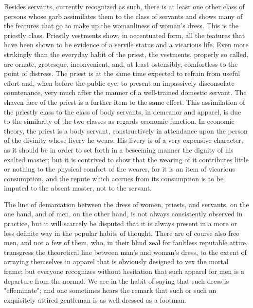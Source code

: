 \documentclass[12pt]{report}
\begin{document}
Besides servants, currently recognized as such, there is at least one
other class of persons whose garb assimilates them to the class
of servants and shows many of the features that go to make up the
womanliness of woman's dress. This is the priestly class. Priestly
vestments show, in accentuated form, all the features that have been
shown to be evidence of a servile status and a vicarious life. Even
more strikingly than the everyday habit of the priest, the vestments,
properly so called, are ornate, grotesque, inconvenient, and, at least
ostensibly, comfortless to the point of distress. The priest is at the
same time expected to refrain from useful effort and, when before the
public eye, to present an impassively disconsolate countenance, very
much after the manner of a well-trained domestic servant. The
shaven face of the priest is a further item to the same effect. This
assimilation of the priestly class to the class of body servants, in
demeanor and apparel, is due to the similarity of the two classes as
regards economic function. In economic theory, the priest is a body
servant, constructively in attendance upon the person of the divinity
whose livery he wears. His livery is of a very expensive character, as
it should be in order to set forth in a beseeming manner the dignity of
his exalted master; but it is contrived to show that the wearing of it
contributes little or nothing to the physical comfort of the wearer,
for it is an item of vicarious consumption, and the repute which accrues
from its consumption is to be imputed to the absent master, not to the
servant.

The line of demarcation between the dress of women, priests, and
servants, on the one hand, and of men, on the other hand, is not always
consistently observed in practice, but it will scarcely be disputed
that it is always present in a more or less definite way in the popular
habits of thought. There are of course also free men, and not a few
of them, who, in their blind zeal for faultless reputable attire,
transgress the theoretical line between man's and woman's dress, to the
extent of arraying themselves in apparel that is obviously designed to
vex the mortal frame; but everyone recognizes without hesitation that
such apparel for men is a departure from the normal. We are in the habit
of saying that such dress is "effeminate"; and one sometimes hears the
remark that such or such an exquisitely attired gentleman is as well
dressed as a footman.
\end{document}
